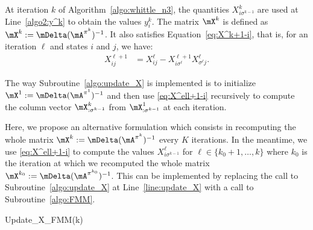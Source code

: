 At iteration $k$ of Algorithm~\ref{algo:whittle_n3}, the quantities $X^{k}_{i\sigma^{k-1}}$ are used at Line~\ref{algo2:y^k} to obtain the values $y^{k}_i$. The matrix $\mX^k$ is defined as $\mX^k:=\mDelta(\mA^{\pi^k})^{-1}$. It also satisfies Equation~\eqref{eq:X^k+1-i}, that is, for an iteration $\ell$ and states $i$ and $j$, we have: 
\begin{align}
    \label{eq:X^ell+1-i}
    X^{\ell+1}_{ij} &= X^{\ell}_{ij} - X^{\ell+1}_{i\sigma^\ell} X^{\ell}_{{\sigma^\ell} j}.
\end{align}

The way Subroutine~\ref{algo:update_X} is implemented is to initialize $\mX^1:=\mDelta(\mA^{\pi^1})^{-1}$ and then use \eqref{eq:X^ell+1-i} recursively to compute the column vector $\mX^{k}_{: \sigma^{k-1}}$ from $\mX^1_{: \sigma^{k-1}}$ at each iteration.

Here, we propose an alternative formulation which consists in recomputing the whole matrix $\mX^{k}:=\mDelta(\mA^{\pi^k})^{-1}$ every $K$ iterations. In the meantime, we use \eqref{eq:X^ell+1-i} to compute the values $X^{\ell}_{i\sigma^{k-1}}$ for ${\ell\in\{k_0+1,\dots, k\}}$ where $k_0$ is the iteration at which we recomputed the whole matrix ${\mX^{k_0}:=\mDelta(\mA^{\pi^{k_0}})^{-1}}$. This can be implemented by replacing the call to Subroutine~\ref{algo:update_X} at Line~\ref{line:update_X} with a call to Subroutine~\ref{algo:FMM}.

\begin{subroutine}[ht]
    \caption{Update\_X\_FMM(k)}
    \label{algo:FMM}
\end{subroutine}

